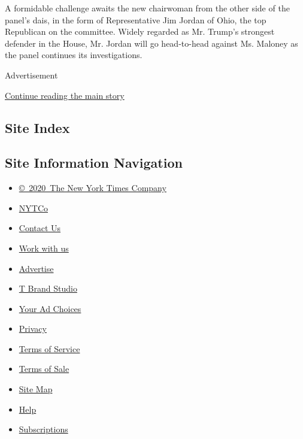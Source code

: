 A formidable challenge awaits the new chairwoman from the other side of
the panel's dais, in the form of Representative Jim Jordan of Ohio, the
top Republican on the committee. Widely regarded as Mr. Trump's
strongest defender in the House, Mr. Jordan will go head-to-head against
Ms. Maloney as the panel continues its investigations.

Advertisement

\protect\hyperlink{after-bottom}{Continue reading the main story}

\hypertarget{site-index}{%
\subsection{Site Index}\label{site-index}}

\hypertarget{site-information-navigation}{%
\subsection{Site Information
Navigation}\label{site-information-navigation}}

\begin{itemize}
\tightlist
\item
  \href{https://help.nytimes3xbfgragh.onion/hc/en-us/articles/115014792127-Copyright-notice}{©~2020~The
  New York Times Company}
\end{itemize}

\begin{itemize}
\tightlist
\item
  \href{https://www.nytco.com/}{NYTCo}
\item
  \href{https://help.nytimes3xbfgragh.onion/hc/en-us/articles/115015385887-Contact-Us}{Contact
  Us}
\item
  \href{https://www.nytco.com/careers/}{Work with us}
\item
  \href{https://nytmediakit.com/}{Advertise}
\item
  \href{http://www.tbrandstudio.com/}{T Brand Studio}
\item
  \href{https://www.nytimes3xbfgragh.onion/privacy/cookie-policy\#how-do-i-manage-trackers}{Your
  Ad Choices}
\item
  \href{https://www.nytimes3xbfgragh.onion/privacy}{Privacy}
\item
  \href{https://help.nytimes3xbfgragh.onion/hc/en-us/articles/115014893428-Terms-of-service}{Terms
  of Service}
\item
  \href{https://help.nytimes3xbfgragh.onion/hc/en-us/articles/115014893968-Terms-of-sale}{Terms
  of Sale}
\item
  \href{https://spiderbites.nytimes3xbfgragh.onion}{Site Map}
\item
  \href{https://help.nytimes3xbfgragh.onion/hc/en-us}{Help}
\item
  \href{https://www.nytimes3xbfgragh.onion/subscription?campaignId=37WXW}{Subscriptions}
\end{itemize}

